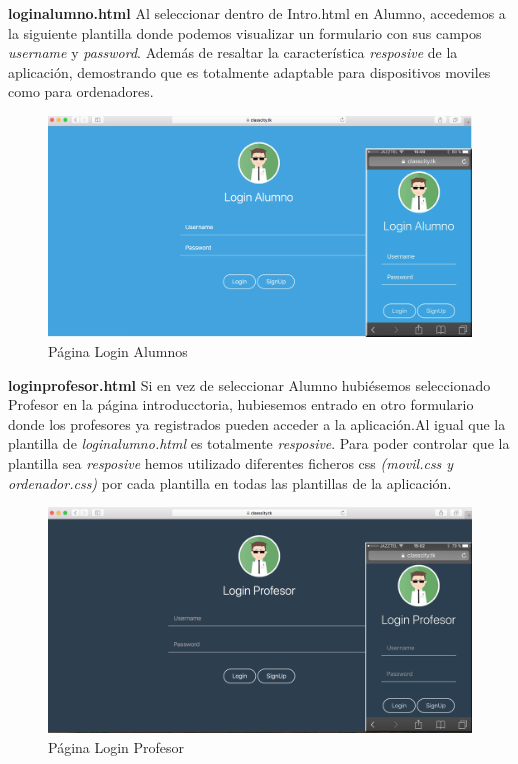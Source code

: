 \textbf{loginalumno.html} Al seleccionar dentro de Intro.html en Alumno, accedemos a la siguiente plantilla donde podemos visualizar un formulario con sus campos \textit{username} y \textit{password}. Además de resaltar la característica \textit{resposive} de la aplicación, demostrando que es totalmente adaptable para dispositivos moviles como para ordenadores.

\begin{figure}[!h]
    \centering
    \includegraphics[width=140mm]{img/templates/loginalumno.png}
    \caption{Página Login Alumnos}
    \label{img:loginalumnoclasscity}
\end{figure}


\textbf{loginprofesor.html} Si en vez de seleccionar Alumno hubiésemos seleccionado Profesor en la página introducctoria, hubiesemos entrado en otro formulario donde los profesores ya registrados pueden acceder a la aplicación.Al igual que la plantilla de \textit{loginalumno.html} es totalmente \textit{resposive}. Para poder controlar que la plantilla sea \textit{resposive} hemos utilizado diferentes ficheros css \textit{(movil.css y ordenador.css)} por cada plantilla en todas las plantillas de la aplicación.
\begin{figure}[!h]
    \centering
    \includegraphics[width=140mm]{img/templates/loginprofesor.png}
    \caption{Página Login Profesor}
    \label{img:loginprofesorclasscity}
\end{figure}

